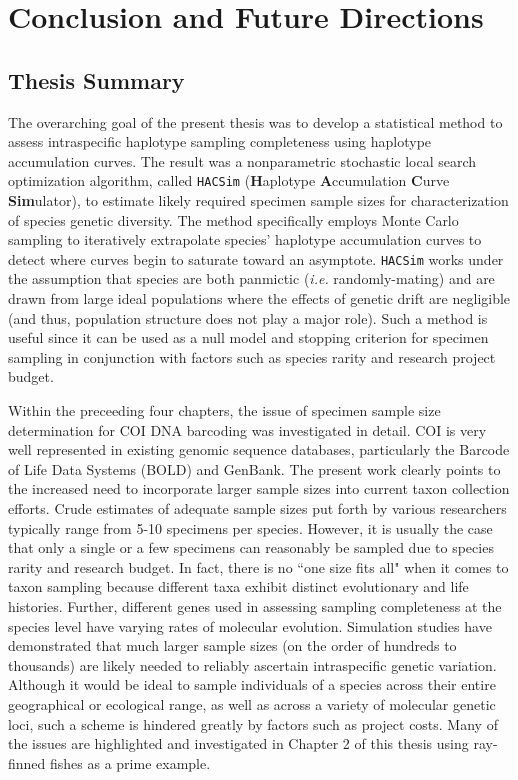 \linespread{1.0}

\chapter{Conclusion and Future Directions}
\section{Thesis Summary} \label{sec:intro1}

The overarching goal of the present thesis was to develop a statistical method to assess intraspecific haplotype sampling completeness using haplotype accumulation curves. The result was a nonparametric stochastic local search optimization algorithm, called {\tt HACSim} (\textbf{H}aplotype \textbf{A}ccumulation \textbf{C}urve \textbf{Sim}ulator), to estimate likely required specimen sample sizes for characterization of species genetic diversity. The method specifically employs Monte Carlo sampling to iteratively extrapolate species' haplotype accumulation curves to detect where curves begin to saturate toward an asymptote. {\tt HACSim} works under the assumption that species are both panmictic (\textit{i.e.} randomly-mating) and are drawn from large ideal populations where the effects of genetic drift are negligible (and thus, population structure does not play a major role). Such a method is useful since it can be used as a null model and stopping criterion for specimen sampling in conjunction with factors such as species rarity and research project budget.

Within the preceeding four chapters, the issue of specimen sample size determination for COI DNA barcoding was investigated in detail. COI is very well represented in existing genomic sequence databases, particularly the Barcode of Life Data Systems (BOLD) and GenBank. The present work clearly points to the increased need to incorporate larger sample sizes into current taxon collection efforts. Crude estimates of adequate sample sizes put forth by various researchers typically range from 5-10 specimens per species. However, it is usually the case that only a single or a few specimens can reasonably be sampled due to species rarity and research budget. In fact, there is no ``one size fits all" when it comes to taxon sampling because different taxa exhibit distinct evolutionary and life histories. Further, different genes used in assessing sampling completeness at the species level have varying rates of molecular evolution. Simulation studies have demonstrated that much larger sample sizes (on the order of hundreds to thousands) are likely needed to reliably ascertain intraspecific genetic variation. Although it would be ideal to sample individuals of a species across their entire geographical or ecological range, as well as across a variety of molecular genetic loci, such a scheme is hindered greatly by factors such as project costs. Many of the issues are highlighted and investigated in Chapter 2 of this thesis using ray-finned fishes as a prime example.

